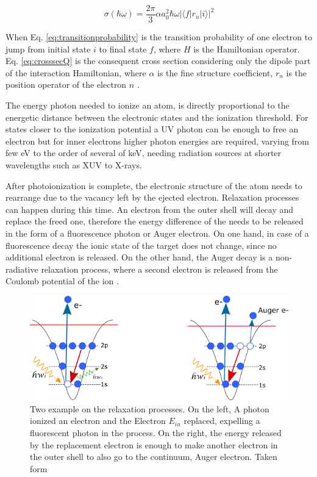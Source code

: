  \begin{equation}
 \label{eq:crosssecQ}
 \sigma(\hbar \omega) = \frac{2\pi}{3} \alpha a_{0}^{2} \hbar \omega |\langle f|r_{n}|i\rangle|^{2}
 \end{equation}
 
When Eq. \ref{eq:transitionprobability} is the transition probability of one electron to jump from initial state $i$ to final state $f$, where $H$ is the Hamiltonian operator. Eq. \ref{eq:crosssecQ} is the consequent cross section considering only the dipole part of the interaction Hamiltonian, where $\alpha$ is the fine structure coefficient, $r_{n}$ is the position operator of the electron $n$ \cite{fermi_quantum_1932}.

The energy photon needed to ionize an atom, is directly proportional to the energetic distance between the electronic states and the ionization threshold. For states closer to the ionization potential a UV photon can be enough to free an electron but for inner electrons higher photon energies are required, varying from few eV to the order of several of keV, needing radiation sources at shorter wavelengths such as XUV to X-rays.\cite{becker_vuv_1996}

After photoionization is complete, the electronic structure of the atom needs to rearrange due to the vacancy left by the ejected electron. Relaxation processes can happen during this time. An electron from the outer shell will decay and replace the freed one, therefore the energy difference of the needs to be released in the form of a fluorescence photon or Auger electron. On one hand, in case of a fluorescence decay the ionic state of the target does not change, since no additional electron is released. On the other hand, the Auger decay is a non-radiative relaxation process, where a second electron is released from the Coulomb potential of the ion \cite{rafipoor_two-color_2017}.
\begin{figure}[h!] 

\centering
\includegraphics[width=12 cm]{../Images/text6418.png}
\caption[Relaxation processes for photoionization]{Two example on the relaxation processes. On the left, A photon ionized an electron and the Electron $E_{in}$ replaced, expelling a fluorescent photon in the process. On the right, the energy released by the replacement electron is enough to make another electron in the outer shell to also go to the continuum, Auger electron. Taken form \cite{rafipoor_two-color_2017}}
\label{fig:augerfluorec}
\end{figure} 

